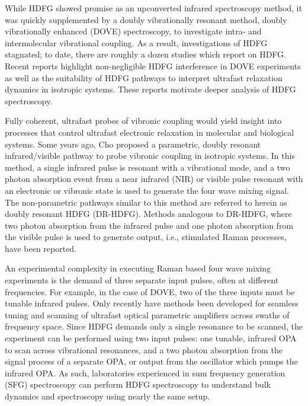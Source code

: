 \documentclass[aip, jcp, reprint, onecolumn]{revtex4-2}
\begin{document}
While HDFG showed promise as an upconverted infrared spectroscopy method, it was quickly supplemented by a doubly vibrationally resonant method, doubly vibrationally enhanced (DOVE) spectroscopy, to investigate intra- and intermolecular vibrational coupling. \cite{RN345, RN101, Cho2000}
As a result, investigations of HDFG stagnated; to date, there are roughly a dozen studies which report on HDFG. \cite{Zilian1994, RN350, RN416, RN351, RN352, RN353, Chen1998, RN362, RN418, Bonn2024, McDonnell2024}
Recent reports highlight non-negligible HDFG interference in DOVE experiments as well as the suitability of HDFG pathways to interpret ultrafast relaxation dynamics in isotropic systems. \cite{Bonn2024, McDonnell2024}
These reports motivate deeper analysis of HDFG spectroscopy. 

Fully coherent, ultrafast probes of vibronic coupling would yield insight into processes that control ultrafast electronic relaxation in molecular and biological systems. \cite{Bredenbeck2015, Arsenault2021}
Some years ago, Cho proposed a parametric, doubly resonant infrared/visible pathway to probe vibronic coupling in isotropic systems. \cite{Cho2001}
In this method, a single infrared pulse is resonant with a vibrational mode, and a two photon absorption event from a near infrared (NIR) or visible pulse resonant with an electronic or vibronic state is used to generate the four wave mixing signal.
The non-parametric pathways similar to this method are referred to herein as doubly resonant HDFG (DR-HDFG).
Methods analogous to DR-HDFG, where two photon absorption from the infrared pulse and one photon absorption from the visible pulse is used to generate output, i.e., stimulated Raman processes, have been reported. \cite{RN301, RN120} 

An experimental complexity in executing Raman based four wave mixing experiments is the demand of three separate input pulses, often at different frequencies.
For example, in the case of DOVE, two of the three inputs must be tunable infrared pulses. \cite{RN345} 
Only recently have methods been developed for seamless tuning and scanning of ultrafast optical parametric amplifiers across swaths of frequency space. \cite{RN162, McDonnell2024}
Since HDFG demands only a single resonance to be scanned, the experiment can be performed using two input pulses: one tunable, infrared OPA to scan across vibrational resonances, and a two photon absorption from the signal process of a separate OPA, or output from the oscillator which pumps the infrared OPA. \cite{Wang2021}
As such, laboratories experienced in sum frequency generation (SFG) spectroscopy can perform HDFG spectroscopy to understand bulk dynamics and spectroscopy using nearly the same setup.
\end{document}
